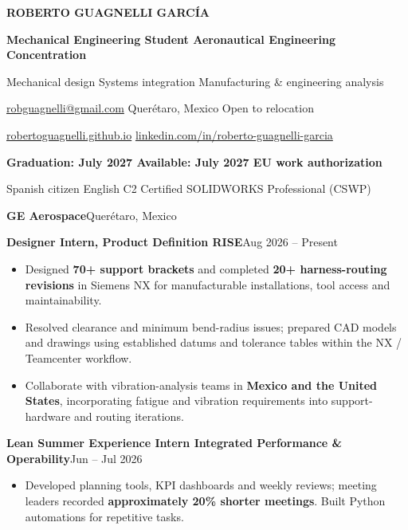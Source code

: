 \documentclass[10pt,a4paper]{article}
\newcommand{\cvsection}[1]{\vspace{7pt}{\color{navy}\fontsize{10.6}{12}\selectfont\bfseries #1}\par\vspace{2pt}{\color{navy}\hrule height .5pt}\vspace{4pt}}
\newcommand{\entry}[2]{\textbf{#1}\hfill{\small\color{muted}#2}\par}
\newcommand{\role}[2]{{\small\textbf{#1}\hfill\color{muted}#2}\par}
\begin{document}
{\color{navy}\fontsize{22}{24}\selectfont\bfseries ROBERTO GUAGNELLI GARC\'IA}\par
\vspace{3pt}
{\fontsize{11}{13}\selectfont\textbf{Mechanical Engineering Student \textbar{} Aeronautical Engineering Concentration}}\par
\vspace{3pt}
{\small Mechanical design \textbullet{} Systems integration \textbullet{} Manufacturing \& engineering analysis}\par
\vspace{5pt}
{\small \href{mailto:robguagnelli@gmail.com}{robguagnelli@gmail.com} \textbar{} Quer\'etaro, Mexico \textbar{} Open to relocation\par
\href{https://robertoguagnelli.github.io/}{robertoguagnelli.github.io} \textbar{} \href{https://www.linkedin.com/in/roberto-guagnelli-garcia/}{linkedin.com/in/roberto-guagnelli-garcia}\par}
\vspace{4pt}
\textbf{Graduation: July 2027 \textbar{} Available: July 2027 \textbar{} EU work authorization}\par
{\small Spanish citizen \textbullet{} English C2 \textbullet{} Certified SOLIDWORKS Professional (CSWP)}

\cvsection{INDUSTRY EXPERIENCE}
\entry{GE Aerospace}{Quer\'etaro, Mexico}
\role{Designer Intern, Product Definition \textbar{} RISE}{Aug 2026 -- Present}
\begin{itemize}
\item Designed \textbf{70+ support brackets} and completed \textbf{20+ harness-routing revisions} in Siemens NX for manufacturable installations, tool access and maintainability.
\item Resolved clearance and minimum bend-radius issues; prepared CAD models and drawings using established datums and tolerance tables within the NX / Teamcenter workflow.
\item Collaborate with vibration-analysis teams in \textbf{Mexico and the United States}, incorporating fatigue and vibration requirements into support-hardware and routing iterations.
\end{itemize}
\vspace{3pt}
\role{Lean Summer Experience Intern \textbar{} Integrated Performance \& Operability}{Jun -- Jul 2026}
\begin{itemize}
\item Developed planning tools, KPI dashboards and weekly reviews; meeting leaders recorded \textbf{approximately 20\% shorter meetings}. Built Python automations for repetitive tasks.
\end{itemize}
\end{document}
